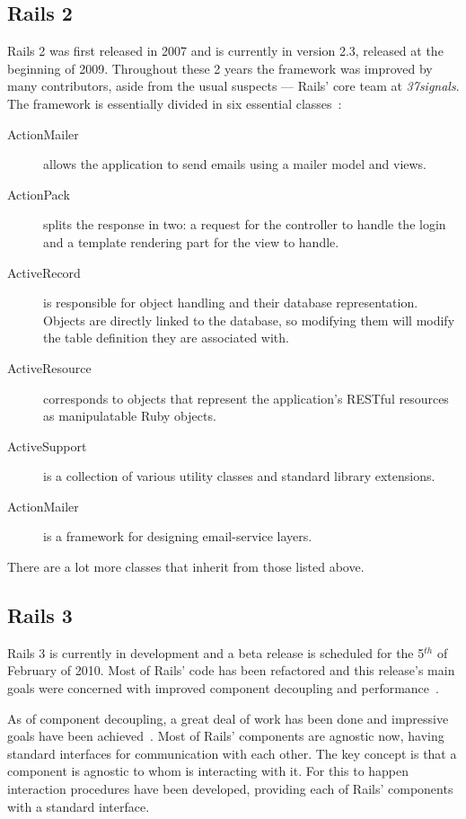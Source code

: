\subsection{Rails 2}
Rails 2 was first released in 2007 and is currently in version 2.3, released at the beginning of 2009. Throughout these 2 years the framework was improved by many contributors, aside from the usual suspects --- Rails' core team at \textit{37signals}. The framework is essentially divided in six essential classes~\cite{ruby_on_rails_principles, rails23_release_notes}:
\begin{description}
\item[ActionMailer] allows the application to send emails using a mailer model and views.
\item[ActionPack] splits the response in two:  a request for the controller to handle the login and a template rendering part for the view to handle.
\item[ActiveRecord] is responsible for object handling and their database representation. Objects are directly linked to the database, so modifying them will modify the table definition they are associated with.
\item[ActiveResource] corresponds to objects that represent the application's RESTful resources as manipulatable Ruby objects.
\item[ActiveSupport] is a collection of various utility classes and standard library extensions.
\item[ActionMailer] is a framework for designing email-service layers.
\end{description}
There are a lot more classes that inherit from those listed above.


\subsection{Rails 3}
\label{tech:sec:ruby_on_rails:rails3}
Rails 3 is currently in development and a beta release is scheduled for the 5$^{th}$ of February of 2010. Most of Rails' code has been refactored and this release's main goals were concerned with improved component decoupling and performance~\cite{rails3_great_decoupling}. 

As of component decoupling, a great deal of work has been done and impressive goals have been achieved~\cite{vaporware_to_awesome}. Most of Rails' components are agnostic now, having standard interfaces for communication with each other. The key concept is that a component is agnostic to whom is interacting with it. For this to happen interaction procedures have been developed, providing each of Rails' components with a standard interface.

